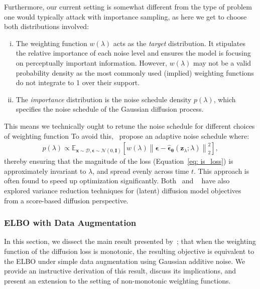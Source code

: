 Furthermore, our current setting is somewhat different from the type of problem one would typically attack with importance sampling, as here we get to choose both distributions involved:
%
\begin{enumerate}[(i)]
    \item The weighting function $w(\lambda)$ acts as the \textit{target} distribution. It stipulates the relative importance of each noise level and ensures the model is focusing on perceptually important information. However, $w(\lambda)$ may not be a valid probability density as the most commonly used (implied) weighting functions do not integrate to 1 over their support.
    \item The \textit{importance} distribution is the noise schedule density $p(\lambda)$, which specifies the noise schedule of the Gaussian diffusion process.
\end{enumerate}
%
This means we technically ought to retune the noise schedule for different choices of weighting function
To avoid this,~\cite{kingma2023understanding} propose an adaptive noise schedule where:
%
\begin{align}
    p(\lambda) \propto \mathbb{E}_{\mathbf{x} \sim \mathcal{D}, \boldsymbol{\epsilon} \sim \mathcal{N}(0, \mathbf{I})} \left[ w(\lambda) \left\| \boldsymbol{\epsilon} - \hat{\boldsymbol{\epsilon}}_{\boldsymbol{\theta}}(\mathbf{z}_\lambda; \lambda) \right\|^2_2 \right],
\end{align}
%
thereby ensuring that the magnitude of the loss (Equation~\ref{eq: is_loss}) is approximately invariant to $\lambda$, and spread evenly across time $t$. This approach is often found to speed up optimization significantly. Both~\cite{song2021maximum} and ~\cite{vahdat2021score} have also explored variance reduction techniques for (latent) diffusion model objectives from a score-based diffusion perspective.
%
\subsubsection{ELBO with Data Augmentation}
\label{subsubsec: elbo with data aug}
%
In this section, we dissect the main result presented by~\cite{kingma2023understanding}; that when the weighting function of the diffusion loss is monotonic, the resulting objective is equivalent to the ELBO under simple data augmentation using Gaussian additive noise. We provide an instructive derivation of this result, discuss its implications, and present an extension to the setting of non-monotonic weighting functions.

